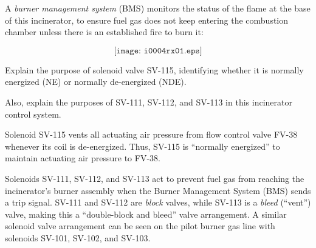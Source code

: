 

A {\it burner management system} (BMS) monitors the status of the flame at the base of this incinerator, to ensure fuel gas does not keep entering the combustion chamber unless there is an established fire to burn it:

$$\texttt{[image: i0004rx01.eps]}$$

Explain the purpose of solenoid valve SV-115, identifying whether it is normally energized (NE) or normally de-energized (NDE).

\vskip 10pt

Also, explain the purposes of SV-111, SV-112, and SV-113 in this incinerator control system.







Solenoid SV-115 vents all actuating air pressure from flow control valve FV-38 whenever its coil is de-energized.  Thus, SV-115 is ``normally energized'' to maintain actuating air pressure to FV-38.

\vskip 10pt

Solenoids SV-111, SV-112, and SV-113 act to prevent fuel gas from reaching the incinerator's burner assembly when the Burner Management System (BMS) sends a trip signal.  SV-111 and SV-112 are {\it block} valves, while SV-113 is a {\it bleed} (``vent'') valve, making this a ``double-block and bleed'' valve arrangement.  A similar solenoid valve arrangement can be seen on the pilot burner gas line with solenoids SV-101, SV-102, and SV-103.












